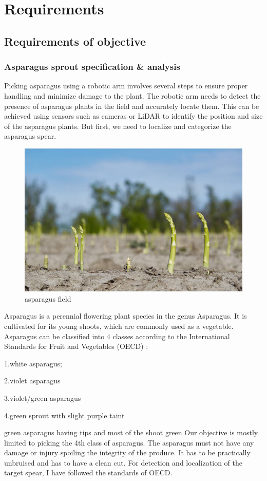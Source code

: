 \chapter{Requirements}
\section{Requirements of objective}
\subsection{Asparagus sprout specification \& analysis}
Picking asparagus using a robotic arm involves several steps to ensure proper handling and minimize damage to the plant. The robotic arm needs to detect the presence of asparagus plants in the field and accurately locate them. This can be achieved using sensors such as cameras or LiDAR to identify the position and size of the asparagus plants. But first, we need to localize and categorize the asparagus spear.

\begin{figure}
    \centering
    \includegraphics[width=0.75\linewidth]{pictures/asp_in_field.png}
    \caption{asparagus field}
    \label{fig:enter-label}
\end{figure}

Asparagus is a perennial flowering plant species in the genus Asparagus. It is cultivated for its young shoots, which are commonly used as a vegetable. Asparagus can be classified into 4 classes according to the International Standards for Fruit and Vegetables (OECD) \cite{oecd2025}:

1.white asparagus;

2.violet asparagus

3.violet/green asparagus

4.green sprout with slight purple taint

green asparagus having tips and most of the shoot green Our objective is mostly limited to picking the 4th class of asparagus. The asparagus must not have any damage or injury spoiling the integrity of the produce. It has to be practically unbruised and has to have a clean cut. For detection and localization of the target spear, I have followed the standards of OECD.

